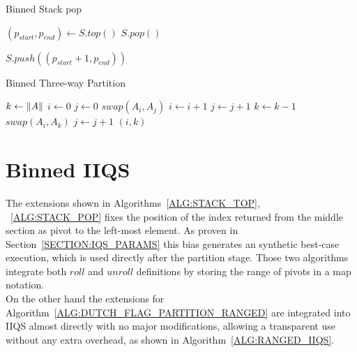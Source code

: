 \begin{algorithm}
    \caption{Binned Stack pop}\label{ALG:STACK_POP}
    \begin{algorithmic}[1]
        \State $(p_{start}, p_{end}) \gets S.top()$
        \State $S.pop()$
    
            \State $S.push((p_{start}+1, p_{end}))$
        \EndIf
        \EndProcedure
\end{algorithmic}
\end{algorithm}

\begin{algorithm}
\caption{Binned Three-way Partition}\label{ALG:DUTCH_FLAG_PARTITION_RANGED}
\begin{algorithmic}[1]
    \State $k \gets \lVert A\rVert$
    \State $i \gets 0$
    \State $j \gets 0$
            \State $swap(A_i, A_j)$
            \State $i \gets i+1$
            \State $j \gets j+1$
            \State $k \gets k-1$
            \State $swap(A_i, A_k)$
        \Else
            \State $j \gets j+1$
        \EndIf
    \EndWhile
    \State \Return $(i,k)$
    \EndProcedure
\end{algorithmic}
\end{algorithm}

\section{Binned IIQS}
The extensions shown in Algorithms~\ref{ALG:STACK_TOP}, ~\ref{ALG:STACK_POP} fixes the position of the index returned from the middle section as pivot to the left-most element. As proven in Section~\ref{SECTION:IQS_PARAMS} this bias generates an synthetic best-case execution, which is used directly after the partition stage. Those two algorithms integrate both $roll$ and $unroll$ definitions by storing the range of pivots in a map notation.\\


On the other hand the extensions for Algorithm~\ref{ALG:DUTCH_FLAG_PARTITION_RANGED} are integrated into IIQS almost directly with no major modifications, allowing a transparent use without any extra overhead, as shown in Algorithm~\ref{ALG:RANGED_IIQS}.\\

